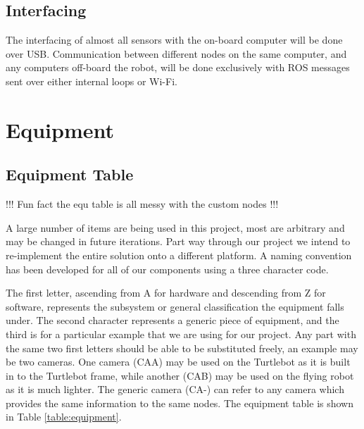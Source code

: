 \documentclass{article}
\begin{document}
	\subsection{Interfacing}
	
	The interfacing of almost all sensors with the on-board computer will be done over USB. Communication between different nodes on the same computer, and any computers off-board the robot, will be done exclusively with ROS messages sent over either internal loops or Wi-Fi.





\section{Equipment}

	\subsection{Equipment Table}

	!!! Fun fact the equ table is all messy with the custom nodes !!!
	
	A large number of items are being used in this project, most are arbitrary and may be changed in future iterations. Part way through our project we intend to re-implement the entire solution onto a different platform. A naming convention has been developed for all of our components using a three character code.
	
	The first letter, ascending from A for hardware and descending from Z for software, represents the subsystem or general classification the equipment falls under. The second character represents a generic piece of equipment, and the third is for a particular example that we are using for our project. Any part with the same two first letters should be able to be substituted freely, an example may be two cameras. One camera (CAA) may be used on the Turtlebot as it is built in to the Turtlebot frame, while another (CAB) may be used on the flying robot as it is much lighter. The generic camera (CA-) can refer to any camera which provides the same information to the same nodes. The equipment table is shown in Table \ref{table:equipment}.
	
\end{document}
